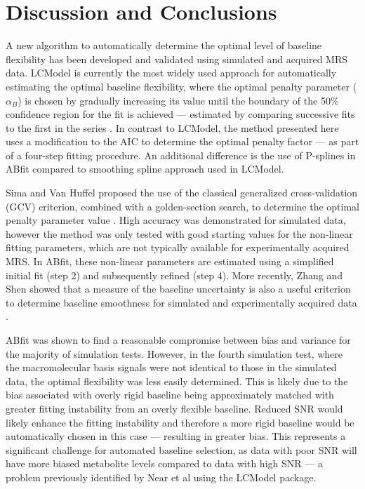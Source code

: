 \documentclass[num-refs]{wiley-article}
\begin{document}
\section{Discussion and Conclusions}
A new algorithm to automatically determine the optimal level of baseline flexibility has been developed and validated using simulated and acquired MRS data. LCModel is currently the most widely used approach for automatically estimating the optimal baseline flexibility, where the optimal penalty parameter ($\alpha_{B}$) is chosen by gradually increasing its value until the boundary of the 50\% confidence region for the fit is achieved --- estimated by comparing successive fits to the first in the series \cite{Provencher1982, Provencher1993}. In contrast to LCModel, the method presented here uses a modification to the AIC to determine the optimal penalty factor --- as part of a four-step fitting procedure. An additional difference is the use of P-splines in ABfit compared to smoothing spline approach \cite{OSullivan1986} used in LCModel.

Sima and Van Huffel proposed the use of the classical generalized cross-validation (GCV) criterion, combined with a golden-section search, to determine the optimal penalty parameter value \cite{Sima2006}. High accuracy was demonstrated for simulated data, however the method was only tested with good starting values for the non-linear fitting parameters, which are not typically available for experimentally acquired MRS. In ABfit, these non-linear parameters are estimated using a simplified initial fit (step 2) and subsequently refined (step 4). More recently, Zhang and Shen showed that a measure of the baseline uncertainty is also a useful criterion to determine baseline smoothness for simulated and experimentally acquired data \cite{Zhang2014}.

ABfit was shown to find a reasonable compromise between bias and variance for the majority of simulation tests. However, in the fourth simulation test, where the macromolecular basis signals were not identical to those in the simulated data, the optimal flexibility was less easily determined. This is likely due to the bias associated with overly rigid baseline being approximately matched with greater fitting instability from an overly flexible baseline. Reduced SNR would likely enhance the fitting instability and therefore a more rigid baseline would be automatically chosen in this case --- resulting in greater bias. This represents a significant challenge for automated baseline selection, as data with poor SNR will have more biased metabolite levels compared to data with high SNR --- a problem previously identified by Near et al \cite{Near2013} using the LCModel package.
\end{document}
